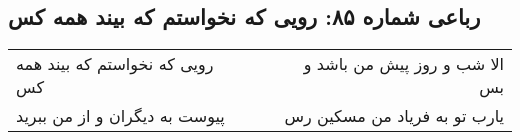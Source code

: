 \begin{center}
\section*{رباعی شماره ۸۵: رویی که نخواستم که بیند همه کس}
\label{sec:085}
\begin{longtable}{l p{0.5cm} r}
رویی که نخواستم که بیند همه کس
&&
الا شب و روز پیش من باشد و بس
\\
پیوست به دیگران و از من ببرید
&&
یارب تو به فریاد من مسکین رس
\\
\end{longtable}
\end{center}
